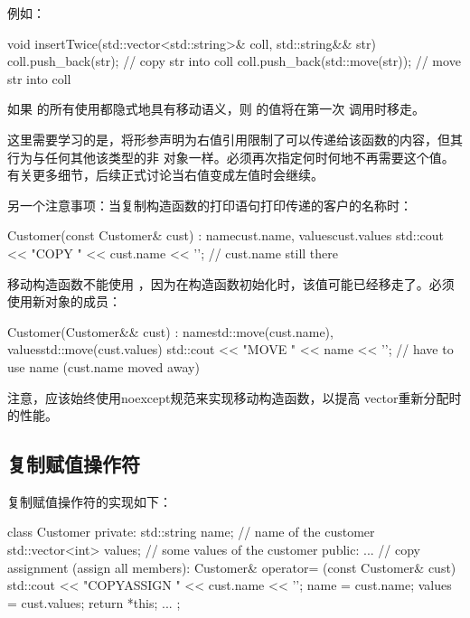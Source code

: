 例如：

\begin{cppcode}
void insertTwice(std::vector<std::string>& coll, std::string&& str)
{
	coll.push_back(str); // copy str into coll
	coll.push_back(std::move(str)); // move str into coll
}
\end{cppcode}

如果  的所有使用都隐式地具有移动语义，则  的值将在第一次  调用时移走。

这里需要学习的是，将形参声明为右值引用限制了可以传递给该函数的内容，但其行为与任何其他该类型的非  对象一样。必须再次指定何时何地不再需要这个值。有关更多细节，后续正式讨论当右值变成左值时会继续。

另一个注意事项：当复制构造函数的打印语句打印传递的客户的名称时：

\begin{cppcode}
Customer(const Customer& cust)
: name{cust.name}, values{cust.values} {
	std::cout << "COPY " << cust.name << '\n'; // cust.name still there
}
\end{cppcode}

移动构造函数不能使用 ，因为在构造函数初始化时，该值可能已经移走了。必须使用新对象的成员：

\begin{cppcode}
Customer(Customer&& cust)
: name{std::move(cust.name)}, values{std::move(cust.values)} {
	std::cout << "MOVE " << name << '\n'; // have to use name (cust.name moved away)
}
\end{cppcode}

注意，应该始终使用noexcept规范来实现移动构造函数，以提高  vector重新分配时的性能。

\subsection{复制赋值操作符}

复制赋值操作符的实现如下：

\begin{cppcode}
class Customer {
	private:
	std::string name; // name of the customer
	std::vector<int> values; // some values of the customer
	public:
	...
	// copy assignment (assign all members):
	Customer& operator= (const Customer& cust) {
		std::cout << "COPYASSIGN " << cust.name << '\n';
		name = cust.name;
		values = cust.values;
		return *this;
	}
...
};
\end{cppcode}

